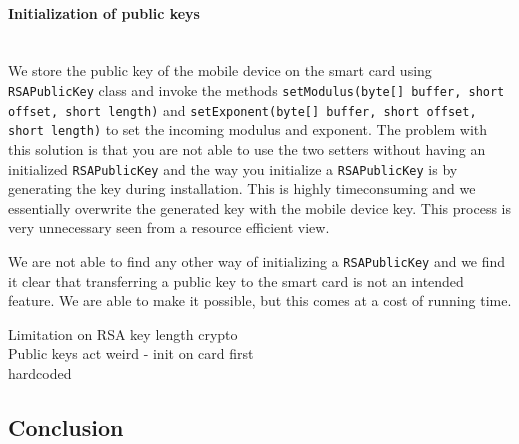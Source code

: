 \paragraph{Initialization of public keys}\mbox{}\\
We store the public key of the mobile device on the smart card using \texttt{RSAPublicKey} class and invoke the methods \texttt{setModulus(byte[] buffer, short offset, short length)} and \texttt{setExponent(byte[] buffer, short offset, short length)} to set the incoming modulus and exponent. The problem with this solution is that you are not able to use the two setters without having an initialized \texttt{RSAPublicKey} and the way you initialize a \texttt{RSAPublicKey} is by generating the key during installation. This is highly timeconsuming and we essentially overwrite the generated key with the mobile device key. This process is very unnecessary seen from a resource efficient view.

We are not able to find any other way of initializing a \texttt{RSAPublicKey} and we find it clear that transferring a public key to the smart card is not an intended feature. We are able to make it possible, but this comes at a cost of running time. 



Limitation on RSA key length crypto \\
Public keys act weird - init on card first \\
hardcoded \\

\subsection{Conclusion}
